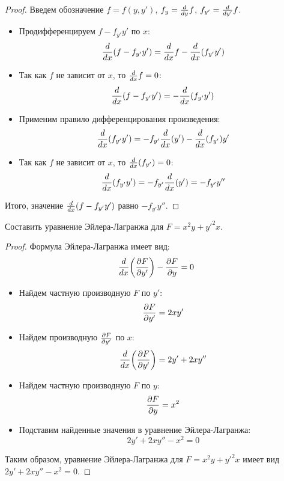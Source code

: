 \begin{proof}
    Введем обозначение $f = f(y, y')$, $f_{y} = \dv{y} f$, $f_{y'} = \dv{y'} f$.

    \begin{itemize}
        \item Продифференцируем $f - f_{y'}y'$ по $x$:
              \[
                  \dv{x}(f - f_{y'}y')
                  = \dv{x} f - \dv{x} (f_{y'}y')
              \]
        \item Так как $f$ не зависит от $x$, то $\dv{x} f = 0$:
              \[
                  \dv{x}(f - f_{y'}y') = - \dv{x} (f_{y'}y')
              \]
        \item Применим правило дифференцирования произведения:
              \[
                  \dv{x} (f_{y'}y') = -f_{y'} \dv{x} (y') - \dv{x} (f_{y'}) y'
              \]
        \item Так как $f$ не зависит от $x$, то $\dv{x} (f_{y'}) = 0$:
              \[
                  \dv{x} (f_{y'}y') = -f_{y'} \dv{x} (y') = -f_{y'} y''
              \]
    \end{itemize}
    Итого, значение $\dv{x}(f - f_{y'}y')$ равно $-f_{y'} y''$.
\end{proof}

\begin{problem}
Составить уравнение Эйлера-Лагранжа для $F = x^2 y + y'^2 x$.
\end{problem}

\begin{proof}
    Формула Эйлера-Лагранжа имеет вид:
    \[
        \dv{x} ( \pdv{F}{y'} ) - \pdv{F}{y} = 0
    \]
    \begin{itemize}
        \item Найдем частную производную $F$ по $y'$:
              \[
                  \pdv{F}{y'} = 2 x y'
              \]
        \item Найдем производную $\pdv{F}{y'}$ по $x$:
              \[
                  \dv{x} ( \pdv{F}{y'} ) = 2 y' + 2 x y''
              \]
        \item Найдем частную производную $F$ по $y$:
              \[
                  \pdv{F}{y} = x^2
              \]
        \item Подставим найденные значения в уравнение Эйлера-Лагранжа:
              \[
                  2 y' + 2 x y'' - x^2 = 0
              \]
    \end{itemize}
    Таким образом, уравнение Эйлера-Лагранжа для $F = x^2 y + y'^2 x$ имеет вид $2 y' + 2 x y'' - x^2 = 0$.
\end{proof}